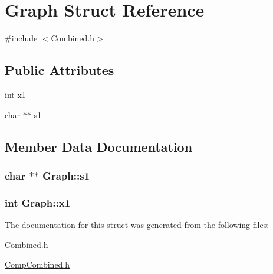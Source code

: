 \hypertarget{structGraph}{\section{Graph Struct Reference}
\label{structGraph}
}


{\ttfamily \#include $<$Combined.\-h$>$}

\subsection*{Public Attributes}
\begin{DoxyCompactItemize}
\item 
int \hyperlink{structGraph_a9dd4ae568a6d821eb75f2ed958475090}{x1}
\item 
char $\ast$$\ast$ \hyperlink{structGraph_a98cbf25f042c08b2a9b7d176e523db45}{s1}
\end{DoxyCompactItemize}


\subsection{Member Data Documentation}
\hypertarget{structGraph_a98cbf25f042c08b2a9b7d176e523db45}{
\subsubsection[{s1}]{\setlength{\rightskip}{0pt plus 5cm}char $\ast$$\ast$ Graph\-::s1}}\label{structGraph_a98cbf25f042c08b2a9b7d176e523db45}
\hypertarget{structGraph_a9dd4ae568a6d821eb75f2ed958475090}{
\subsubsection[{x1}]{\setlength{\rightskip}{0pt plus 5cm}int Graph\-::x1}}\label{structGraph_a9dd4ae568a6d821eb75f2ed958475090}


The documentation for this struct was generated from the following files\-:\begin{DoxyCompactItemize}
\item 
\hyperlink{Combined_8h}{Combined.\-h}\item 
\hyperlink{CompCombined_8h}{Comp\-Combined.\-h}\end{DoxyCompactItemize}
